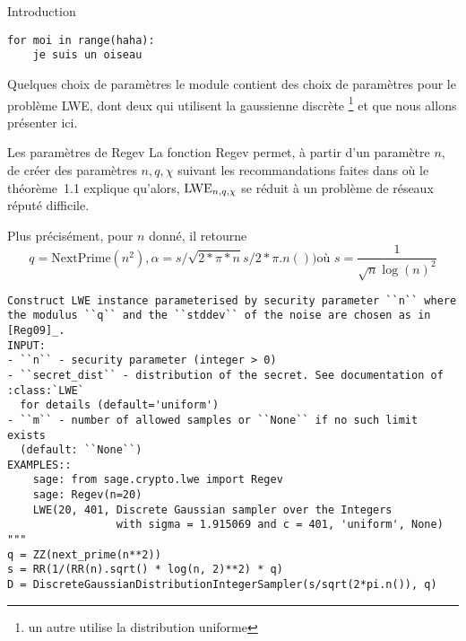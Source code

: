 \lstlistoflistings
\begin{section}{Introduction}
	\begin{lstlisting}[caption=ceci est un test, captionpos=b]
for moi in range(haha):
	je suis un oiseau
\end{lstlisting}

\begin{subsection}{Quelques choix de paramètres}
le module  contient des choix de paramètres pour
le problème LWE, dont deux qui utilisent la gaussienne discrète
\footnote{un autre utilise la distribution uniforme}
et que nous allons présenter ici.
\begin{subsubsection}{Les paramètres de Regev}
	La fonction Regev permet, à partir d'un paramètre $n$, de 
	créer des paramètres $n, q, \chi$ suivant les recommandations  
	faites dans \cite{STOC:Regev05} où le théorème~1.1 explique 
	qu'alors, $\text{LWE}_{n,q,\chi}$ se réduit à un problème de réseaux réputé 
	difficile.

	Plus précisément, pour $n$ donné, il retourne
	\[q = \text{NextPrime}(n^2), \alpha = s/\sqrt{2*\pi*n}s/2*\pi.n()) \text{où }
	s=\frac{1}{\sqrt{n} \log(n)^2}\]

\begin{lstlisting}
Construct LWE instance parameterised by security parameter ``n`` where
the modulus ``q`` and the ``stddev`` of the noise are chosen as in
[Reg09]_.
INPUT:
- ``n`` - security parameter (integer > 0)
- ``secret_dist`` - distribution of the secret. See documentation of :class:`LWE`
  for details (default='uniform')
- ``m`` - number of allowed samples or ``None`` if no such limit exists
  (default: ``None``)
EXAMPLES::
    sage: from sage.crypto.lwe import Regev
    sage: Regev(n=20)
    LWE(20, 401, Discrete Gaussian sampler over the Integers 
                 with sigma = 1.915069 and c = 401, 'uniform', None)
"""
q = ZZ(next_prime(n**2))
s = RR(1/(RR(n).sqrt() * log(n, 2)**2) * q)
D = DiscreteGaussianDistributionIntegerSampler(s/sqrt(2*pi.n()), q)
\end{lstlisting}
\end{subsubsection}


\end{subsection}
\end{section}
